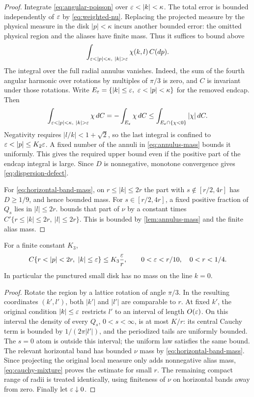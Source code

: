 \begin{proof}
Integrate \cref{eq:angular-poisson} over \(\eps<|k|<\kappa\).
The total error is bounded independently of \(\varepsilon\) by
\cref{eq:weighted-nu}. Replacing the projected measure by the physical
measure in the disk \(|p|<\kappa\) incurs another bounded error: the omitted
physical region and the aliases have finite mass. Thus it suffices to bound
above
\[
 \int_{\eps<|p|<\kappa,\ |k|>\eps}\chi(k,l)\,C(dp).
\]
The integral over the full radial annulus vanishes. Indeed, the sum of the
fourth angular harmonic over rotations by multiples of \(\pi/3\) is zero,
and \(C\) is invariant under those rotations. Write
\(E_\eps=\{|k|\le\eps,\ \eps<|p|<\kappa\}\) for the removed endcap.
Then
\[
 \int_{\eps<|p|<\kappa,\ |k|>\eps}\chi\,dC
 =-\int_{E_\eps}\chi\,dC
 \le\int_{E_\eps\cap\{\chi<0\}}|\chi|\,dC.
\]
Negativity requires \(|l/k|<1+\sqrt2\), so the last integral is confined
to \(\eps<|p|\le K_2\eps\). A fixed number of the annuli in
\cref{eq:annulus-mass} bounds it uniformly. This gives the required upper
bound even if the positive part of the endcap integral is large. Since
\(D\) is nonnegative, monotone convergence gives
\cref{eq:dispersion-defect}.

For \cref{eq:horizontal-band-mass}, on \(r\le|k|\le2r\) the part with
\(s\notin[r/2,4r]\) has \(D\ge1/9\), and hence bounded mass. For
\(s\in[r/2,4r]\), a fixed positive fraction of \(Q_s\) lies in
\(|l|\le2r\).  bounds that part of \(\nu\)
by a constant times
\(C'\{r\le|k|\le2r,\ |l|\le2r\}\). This is bounded by
\cref{lem:annulus-mass} and the finite alias mass.
\end{proof}

\begin{lemma}
\label{lem:endcap}
For a finite constant \(K_3\),
\begin{equation}
 \label{eq:endcap}
 C\{r<|p|<2r,\ |k|\le\eps\}\le K_3\frac{\eps}{r},
 \qquad 0<\eps<r/10,\quad 0<r<1/4.
\end{equation}
In particular the punctured small disk has no mass on the line \(k=0\).
\end{lemma}

\begin{proof}
Rotate the region by a lattice rotation of angle \(\pi/3\). In the resulting
coordinates \((k',l')\), both \(|k'|\) and \(|l'|\) are comparable to \(r\).
At fixed \(k'\), the original condition \(|k|\le\varepsilon\) restricts \(l'\) to
an interval of length \(O(\varepsilon)\). On this interval the density of every
\(Q_s\), \(0<s<\infty\), is at most \(K/r\): its central Cauchy term is
bounded by \(1/(2\pi|l'|)\), and the periodized tails are uniformly bounded.
The \(s=0\) atom is outside this interval; the uniform law satisfies the same
bound. The relevant horizontal band has bounded \(\nu\) mass by
\cref{eq:horizontal-band-mass}. Since projecting the original local measure
only adds nonnegative alias mass, \cref{eq:cauchy-mixture} proves the estimate
for small \(r\). The remaining compact range of radii is treated identically,
using finiteness of \(\nu\) on horizontal bands away from zero. Finally let
\(\varepsilon\downarrow0\).
\end{proof}

